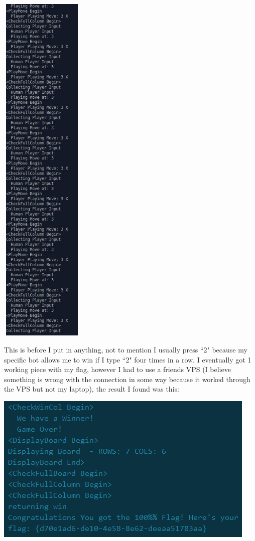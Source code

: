 \documentclass{article}
\newcommand\tab[1][.5cm]{\hspace*{#1}}
\begin{document}
	\begin{center}
		\includegraphics[width=4cm, height=17.5cm]{what.jpg}
	\end{center}

	\tab This is before I put in anything, not to mention I usually press ``2" because my specific bot allows
	me to win if I type ``2" four times in a row. I eventually got 1 working piece with my flag, however I
	had to use a friends VPS (I believe something is wrong with the connection in some way because it worked
	through the VPS but not my laptop), the result I found was this:
	\begin{center}
		\includegraphics{WinnerFlag.png}
	\end{center}
\end{document}
